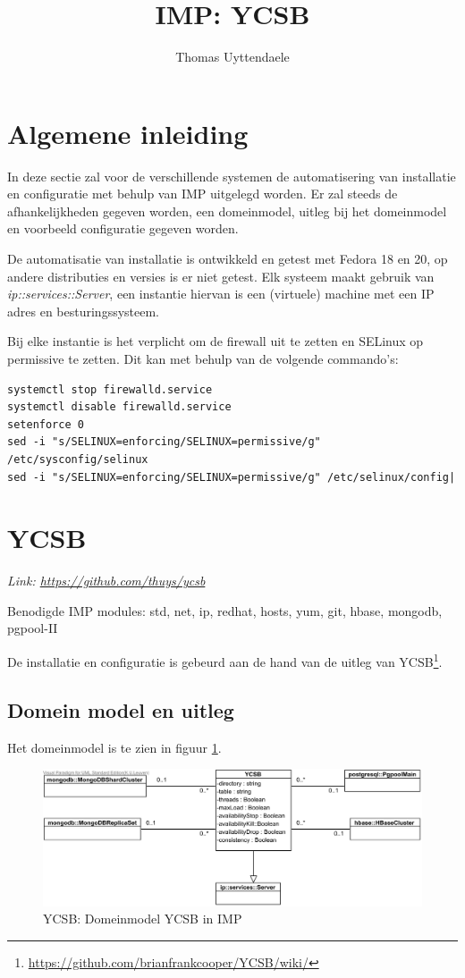\documentclass[]{article}
\title{IMP: YCSB}
\author{Thomas Uyttendaele}
\begin{document}
\maketitle
\section{Algemene inleiding}
In deze sectie zal voor de verschillende systemen de automatisering van installatie en configuratie met behulp van IMP uitgelegd worden. Er zal steeds de afhankelijkheden gegeven worden, een domeinmodel, uitleg bij het domeinmodel en voorbeeld configuratie gegeven worden. 

De automatisatie van installatie is ontwikkeld en getest met Fedora 18 en 20, op andere distributies en versies is er niet getest. 
Elk systeem maakt gebruik van \textit{ip::services::Server}, een instantie hiervan is een (virtuele) machine met een IP adres en besturingssysteem. 

Bij elke instantie is het verplicht om de firewall uit te zetten en SELinux op permissive te zetten. Dit kan met behulp van de volgende commando's: 
\begin{lstlisting}[frame=single, breaklines=true]
systemctl stop firewalld.service  
systemctl disable firewalld.service  
setenforce 0
sed -i "s/SELINUX=enforcing/SELINUX=permissive/g" /etc/sysconfig/selinux
sed -i "s/SELINUX=enforcing/SELINUX=permissive/g" /etc/selinux/config|
\end{lstlisting}

\section{YCSB}
\textit{Link: \url{https://github.com/thuys/ycsb}}

Benodigde IMP modules: std, net, ip, redhat, hosts, yum, git, hbase, mongodb, pgpool-II 

De installatie en configuratie is gebeurd aan de hand van de uitleg van YCSB\footnote{\url {https://github.com/brianfrankcooper/YCSB/wiki/}}. 

\subsection{Domein model en uitleg}
Het domeinmodel is te zien in figuur \ref{fig:imp-ycsb-domeinmodel}.
\begin{figure}[ht!]
\centering
\includegraphics[width=\linewidth]{img/YCSB-Domeinmodel.png}
\caption{YCSB: Domeinmodel YCSB in IMP}
\label{fig:imp-ycsb-domeinmodel}
\end{figure}
\end{document}
